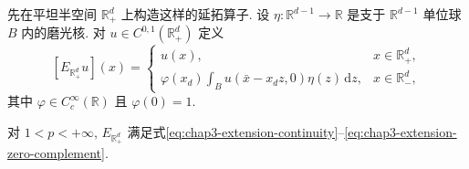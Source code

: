 先在平坦半空间 $\mathbb R_+^d$ 上构造这样的延拓算子. 设 $\eta:\mathbb R^{d-1}\to\mathbb R$ 是支于 $\mathbb R^{d-1}$ 单位球 $B$ 内的磨光核. 对 $u\in C^{0,1}(\mathbb R_+^d)$ 定义
\[
 [E_{\mathbb R_+^d}u](x)=
 \begin{cases}
 u(x),&x\in\mathbb R_+^d,\\
 \varphi(x_d)\displaystyle\int_Bu(\bar x-x_dz,0)\eta(z)\,\mathrm dz,&x\in\mathbb R_-^d,
 \end{cases}
\]
其中 $\varphi\in C_c^\infty(\mathbb R)$ 且 $\varphi(0)=1$.

\begin{Proposition}
\label{prop:chap3-flat-half-space-extension}
对 $1<p<+\infty$, $E_{\mathbb R_+^d}$ 满足式\eqref{eq:chap3-extension-continuity}--\eqref{eq:chap3-extension-zero-complement}.
\end{Proposition}


